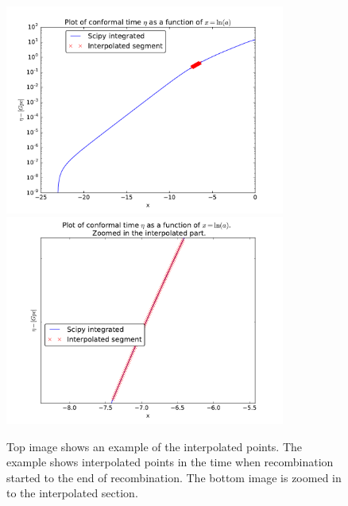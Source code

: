 \documentclass[12pt]{article}
\begin{document}
\begin{figure}[h]
\centering
\includegraphics[width=0.82\textwidth]{Plots/Interpolated_Example.pdf}
\includegraphics[width=0.82\textwidth]{Plots/Interpolated_Example_zoomed.pdf}
\caption{Top image shows an example of the interpolated points. The example shows interpolated points in the time when recombination started to the end of recombination. The bottom image is zoomed in to the interpolated section.}
\label{fig:Interpolated_point}
\end{figure}


\FloatBarrier
\end{document}
